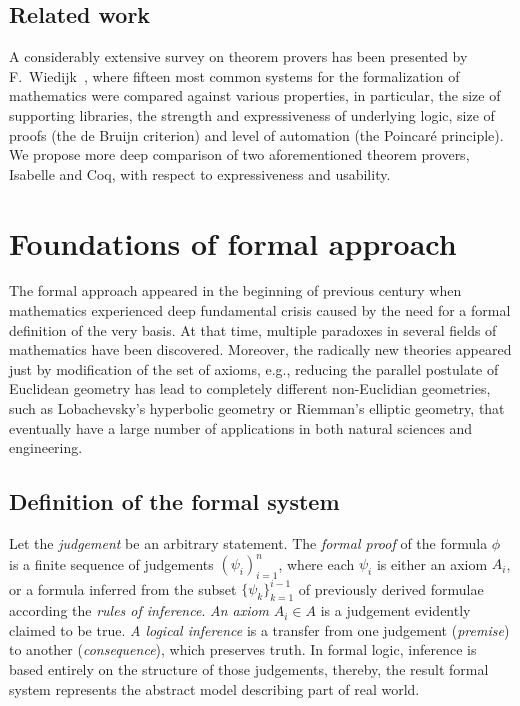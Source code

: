 \documentclass[article]{aaltoseries}
\begin{document}
\subsection{Related work}
A considerably extensive survey on theorem provers has been presented by F.~Wiedijk~\cite{Wie03}, where fifteen most common systems for the formalization of mathematics were compared against various properties, in particular, the size of supporting libraries, the strength and expressiveness of underlying logic, size of proofs (the de Bruijn criterion) and level of automation (the Poincaré principle). We propose more deep comparison of two aforementioned theorem provers, Isabelle and Coq, with respect to expressiveness and usability.




\section{Foundations of formal approach}
\label{sec:formal_theory}

The formal approach appeared in the beginning of previous century when mathematics experienced deep fundamental crisis caused by the need for a formal definition of the very basis. At that time, multiple paradoxes in several fields of mathematics have been discovered. Moreover, the radically new theories appeared just by modification of the set of axioms, e.g., reducing the parallel postulate of Euclidean geometry has lead to completely different non-Euclidian geometries, such as Lobachevsky's hyperbolic geometry or Riemman's elliptic geometry, that eventually have a large number of applications in both natural sciences and engineering.


\subsection{Definition of the formal system}
\label{sec:definitions}


Let the \textit{judgement} be an arbitrary statement. The \textit{formal proof} of the formula $\phi$ is a finite sequence of judgements $ ( \psi_i )_{i=1}^{n} $, where each $\psi_i$ is either an axiom $A_i$, or a formula inferred from the subset $\{ \psi_k \}_{k=1}^{i-1}$ of previously derived formulae according the \textit{rules of inference}. \textit{An axiom} $A_i \in A$ is a judgement evidently claimed to be true. \textit{A logical inference} is a transfer from one judgement (\textit{premise}) to another (\textit{consequence}), which preserves truth. In formal logic, inference is based entirely on the structure of those judgements, thereby, the result formal system represents the abstract model describing part of real world.
\end{document}
